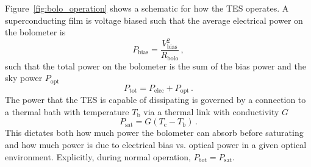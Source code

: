 Figure~\ref{fig:bolo_operation} shows a schematic for how the TES operates. A superconducting film is voltage biased such that the average electrical power on the bolometer is
\begin{equation}
    P_{\mathrm{bias}} = \frac{V_{\mathrm{bias}}^{2}}{R_{\mathrm{bolo}}} \, ,
    \label{eq:bolometer_p_bias}
\end{equation}
such that the total power on the bolometer is the sum of the bias power and the sky power $P_{\mathrm{opt}}$
\begin{equation}
    P_{\mathrm{tot}} = P_{\mathrm{elec}} + P_{\mathrm{opt}} \, .
    \label{eq:bolometer_power_equilibrium}
\end{equation}
The power that the TES is capable of dissipating is governed by a connection to a thermal bath with temperature $T_{\mathrm{b}}$ via a thermal link with conductivity $G$
\begin{equation}
    P_{\mathrm{sat}} = G (T_{\mathrm{c}} - T_{\mathrm{b}}) \, .
    \label{eq:saturation_power}
\end{equation}
This  dictates both how much power the bolometer can absorb before saturating and how much power is due to electrical bias vs. optical power in a given optical environment. Explicitly, during normal operation, $P_{\mathrm{tot}} = P_{\mathrm{sat}}$. 

